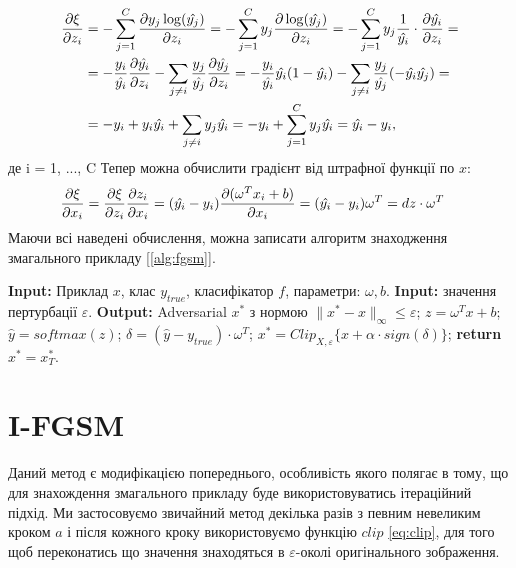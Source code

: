 \documentclass[a4paper,12pt]{extreport}
\renewcommand{\algorithmicrequire}{\textbf{Input: }}
\renewcommand{\algorithmicensure}{\textbf{Output: }}
\newcommand{\algorithmreturn}{\textbf{return }}
\newcommand{\tran}{^{T}}
\begin{document}
	\begin{align*}
		\pdv{\xi}{z_i} 
		&= 
		- \sum_{j=1}^{C} \pdv{ y_j \log (\hat{y_j})}{z_i} 
		=
		- \sum_{j=1}^{C} y_j \pdv{ \log (\hat{y_j})}{z_i} 
		= 
		- \sum_{j=1}^{C} y_j \frac{1}{\hat{y_i}} \cdot \pdv{\hat{y_i}}{z_i} 
		= \\& =
		- \frac{y_i}{\hat{y_i}} \pdv{\hat{y_i}}{z_i} - \sum_{j \neq i} \frac{y_j}{\hat{y_j}} \pdv{\hat{y_j}}{z_i} 
		= 
		-\frac{y_i}{\hat{y_i}} \hat{y_i} (1 - \hat{y_i}) - \sum_{j \neq i} \frac{y_j}{\hat{y_j}} (-\hat{y_i} \hat{y_j}) 
		= \\& =
		-y_i + y_i \hat{y_i} + \sum_{j \neq i} y_j \hat{y_i}
		= 
		-y_i + \sum_{j=1}^{C} y_j \hat{y_i} 
		=
		\hat{y_i} - y_i ,
	\end{align*}
	\endgroup
	де i = 1, ..., C
	\newline	
	Тепер можна обчислити градієнт від штрафної функції по $x$:
	\begin{align}
		\pdv{\xi}{x_i} 
		&=
		\pdv{\xi}{z_i} \pdv{z_i}{x_i} 
		=
		(\hat{y_i} - y_i) \pdv{(\omega\tran x_i+ b)}{x_i} 
		=
		(\hat{y_i} - y_i) \omega\tran 
		=
		dz \cdot \omega\tran
	\end{align}
	 Маючи всі наведені обчислення, можна записати алгоритм знаходження змагального прикладу [\ref{alg:fgsm}].
	\begin{algorithm}
		\caption{$FGSM$}
		\label{alg:fgsm}
		\begin{algorithmic}[1]
			\State \algorithmicrequire{Приклад $x$, клас $y_{true}$, класифікатор $f$, параметри: $\omega, b$.}
			\State \algorithmicrequire{значення пертурбації $\varepsilon$.}
			\State \algorithmicensure{ Adversarial $x^{*}$ з нормою $\|x^{*} - x\|_{\infty} \leq \varepsilon $;}
			\State $z = \omega\tran x + b$;
			\State $\hat{y} = softmax(z)$;
			\State $\delta = (\hat{y} - y_{true}) \cdot \omega\tran$;
			\State $x^{*} = Clip_{X, \varepsilon} \big\{ x + \alpha \cdot sign( \delta ) \big\}$;
			\State \algorithmreturn{$x^{*} = x^{*}_{T}$}.
		\end{algorithmic}
	\end{algorithm}
	
	\section{I-FGSM}
	Даний метод є модифікацією попереднього, особливість якого полягає в тому, що для знахождення змагального прикладу буде використовуватись ітераційний підхід.	Ми застосовуємо звичайний метод декілька разів з певним невеликим кроком $a$ і після кожного кроку використовуємо функцію $clip$ \ref{eq:clip}, для того щоб переконатись що значення знаходяться в $\varepsilon$-околі оригінального зображення.
\end{document}
